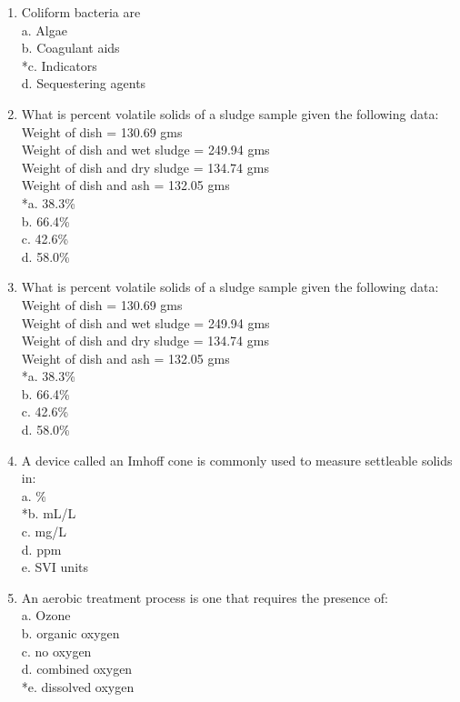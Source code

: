 \begin{enumerate}
\item Coliform bacteria are \\

a. Algae \\
b. Coagulant aids \\
*c. Indicators \\
d. Sequestering agents 



\item What is percent volatile solids of a sludge sample given the following data:\\
Weight of dish = 130.69 gms\\
Weight of dish and wet sludge = 249.94 gms\\
Weight of dish and dry sludge = 134.74 gms\\
Weight of dish and ash = 132.05 gms \\

*a. 38.3\% \\
b. 66.4\% \\
c. 42.6\% \\
d. 58.0\% 

\item What is percent volatile solids of a sludge sample given the following data:\\
Weight of dish = 130.69 gms\\
Weight of dish and wet sludge = 249.94 gms\\
Weight of dish and dry sludge = 134.74 gms\\
Weight of dish and ash = 132.05 gms\\

*a. 38.3\% \\
b. 66.4\% \\
c. 42.6\% \\
d. 58.0\% 

\item A device called an Imhoff cone is commonly used to measure settleable solids in: \\

a. \% \\
*b. mL/L \\
c. mg/L \\
d. ppm \\
e. SVI units 

\item An aerobic treatment process is one that requires the presence of: \\

a. Ozone \\
b. organic oxygen \\
c. no oxygen \\
d. combined oxygen \\
*e. dissolved oxygen 


\end{enumerate}
